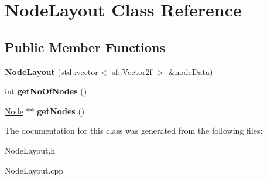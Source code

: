 \hypertarget{class_node_layout}{}\section{Node\+Layout Class Reference}
\label{class_node_layout}
\subsection*{Public Member Functions}
\begin{DoxyCompactItemize}
\item 
\mbox{\label{class_node_layout_ade973fd5d7149decaf741ab3c1f91c43}} 
{\bfseries Node\+Layout} (std\+::vector$<$ sf\+::\+Vector2f $>$ \&node\+Data)
\item 
\mbox{\label{class_node_layout_abab0b8ec4319ee8171c7485b4bd8b542}} 
int {\bfseries get\+No\+Of\+Nodes} ()
\item 
\mbox{\label{class_node_layout_a8d764ef2d9fb8f0cefe008add406c9bc}} 
\mbox{\hyperlink{class_node}{Node}} $\ast$$\ast$ {\bfseries get\+Nodes} ()
\end{DoxyCompactItemize}


The documentation for this class was generated from the following files\+:\begin{DoxyCompactItemize}
\item 
Node\+Layout.\+h\item 
Node\+Layout.\+cpp\end{DoxyCompactItemize}
